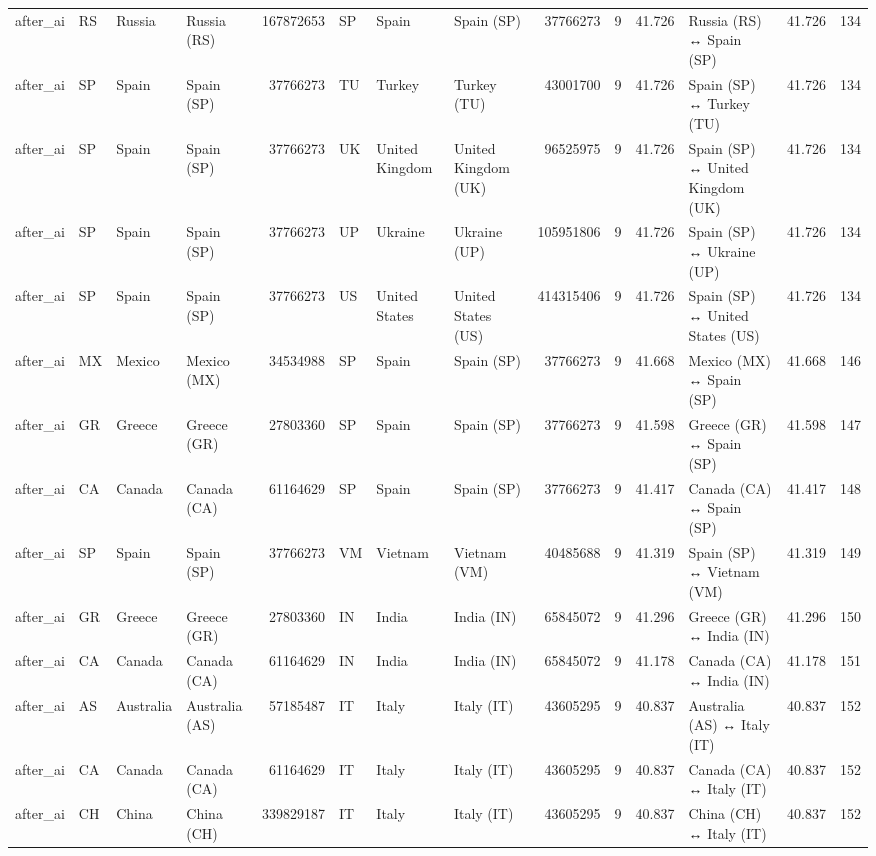 \begin{tabular}{llllrlllrrrlrr}
after\_ai & RS & Russia & Russia (RS) & 167872653 & SP & Spain & Spain (SP) & 37766273 & 9 & 41.726 & Russia (RS) ↔ Spain (SP) & 41.726 & 134 \\
after\_ai & SP & Spain & Spain (SP) & 37766273 & TU & Turkey & Turkey (TU) & 43001700 & 9 & 41.726 & Spain (SP) ↔ Turkey (TU) & 41.726 & 134 \\
after\_ai & SP & Spain & Spain (SP) & 37766273 & UK & United Kingdom & United Kingdom (UK) & 96525975 & 9 & 41.726 & Spain (SP) ↔ United Kingdom (UK) & 41.726 & 134 \\
after\_ai & SP & Spain & Spain (SP) & 37766273 & UP & Ukraine & Ukraine (UP) & 105951806 & 9 & 41.726 & Spain (SP) ↔ Ukraine (UP) & 41.726 & 134 \\
after\_ai & SP & Spain & Spain (SP) & 37766273 & US & United States & United States (US) & 414315406 & 9 & 41.726 & Spain (SP) ↔ United States (US) & 41.726 & 134 \\
after\_ai & MX & Mexico & Mexico (MX) & 34534988 & SP & Spain & Spain (SP) & 37766273 & 9 & 41.668 & Mexico (MX) ↔ Spain (SP) & 41.668 & 146 \\
after\_ai & GR & Greece & Greece (GR) & 27803360 & SP & Spain & Spain (SP) & 37766273 & 9 & 41.598 & Greece (GR) ↔ Spain (SP) & 41.598 & 147 \\
after\_ai & CA & Canada & Canada (CA) & 61164629 & SP & Spain & Spain (SP) & 37766273 & 9 & 41.417 & Canada (CA) ↔ Spain (SP) & 41.417 & 148 \\
after\_ai & SP & Spain & Spain (SP) & 37766273 & VM & Vietnam & Vietnam (VM) & 40485688 & 9 & 41.319 & Spain (SP) ↔ Vietnam (VM) & 41.319 & 149 \\
after\_ai & GR & Greece & Greece (GR) & 27803360 & IN & India & India (IN) & 65845072 & 9 & 41.296 & Greece (GR) ↔ India (IN) & 41.296 & 150 \\
after\_ai & CA & Canada & Canada (CA) & 61164629 & IN & India & India (IN) & 65845072 & 9 & 41.178 & Canada (CA) ↔ India (IN) & 41.178 & 151 \\
after\_ai & AS & Australia & Australia (AS) & 57185487 & IT & Italy & Italy (IT) & 43605295 & 9 & 40.837 & Australia (AS) ↔ Italy (IT) & 40.837 & 152 \\
after\_ai & CA & Canada & Canada (CA) & 61164629 & IT & Italy & Italy (IT) & 43605295 & 9 & 40.837 & Canada (CA) ↔ Italy (IT) & 40.837 & 152 \\
after\_ai & CH & China & China (CH) & 339829187 & IT & Italy & Italy (IT) & 43605295 & 9 & 40.837 & China (CH) ↔ Italy (IT) & 40.837 & 152 \\

\end{tabular}
